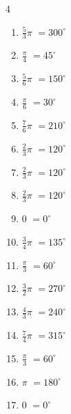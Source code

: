 \begin{multicols}{4}
\begin{enumerate}
  \item $\displaystyle \frac{5}{3}\pi$
        $\displaystyle =300^{\circ}$

  \item $\displaystyle \frac{\pi}{4}$
        $\displaystyle =45^{\circ}$

  \item $\displaystyle \frac{5}{6}\pi$
        $\displaystyle =150^{\circ}$

  \item $\displaystyle \frac{\pi}{6}$
        $\displaystyle =30^{\circ}$

  \item $\displaystyle \frac{7}{6}\pi$
        $\displaystyle =210^{\circ}$

  \item $\displaystyle \frac{2}{3}\pi$
        $\displaystyle =120^{\circ}$

  \item $\displaystyle \frac{2}{3}\pi$
        $\displaystyle =120^{\circ}$

  \item $\displaystyle \frac{2}{3}\pi$
        $\displaystyle =120^{\circ}$

\columnbreak %

\resetques

  \item $\displaystyle 0$
        $\displaystyle =0^{\circ}$

  \item $\displaystyle \frac{3}{4}\pi$
        $\displaystyle =135^{\circ}$

  \item $\displaystyle \frac{\pi}{3}$
        $\displaystyle =60^{\circ}$

  \item $\displaystyle \frac{3}{2}\pi$
        $\displaystyle =270^{\circ}$

  \item $\displaystyle \frac{4}{3}\pi$
        $\displaystyle =240^{\circ}$

  \item $\displaystyle \frac{7}{4}\pi$
        $\displaystyle =315^{\circ}$

  \item $\displaystyle \frac{\pi}{3}$
        $\displaystyle =60^{\circ}$

  \item $\displaystyle \pi$
        $\displaystyle =180^{\circ}$

  \item $\displaystyle 0$
        $\displaystyle =0^{\circ}$


\end{enumerate}
\end{multicols}
